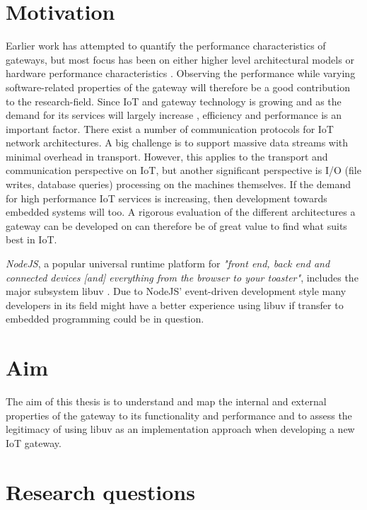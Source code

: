 \section{Motivation}
\label{sec:motivation}

Earlier work has attempted to quantify the performance characteristics of
gateways, but most focus has been on either higher level architectural models
\cite{chen2011brief} \cite{zachariah2015internet} or hardware performance
characteristics \cite{kruger2014benchmarking}. Observing the performance while
varying software-related properties of the gateway will therefore be a good
contribution to the research-field. Since IoT and gateway technology is growing
and as the demand for its services will largely increase \cite{wu2011m2m},
efficiency and performance is an important factor. There exist a number of
communication protocols for IoT network architectures. A big challenge is to
support massive data streams with minimal overhead in transport. However, this
applies to the transport and communication perspective on IoT, but another
significant perspective is I/O (file writes, database queries) processing on
the machines themselves. If the demand for high performance IoT services is
increasing, then development towards embedded systems will too. A rigorous
evaluation of the different architectures a gateway can be developed on can
therefore be of great value to find what suits best in IoT.

\textit{NodeJS}, a popular universal runtime platform for \textit{"front end,
back end and connected devices [and] everything from the browser to your
toaster"}, includes the major subsystem libuv
\cite{node-js-survey-report-2016}. Due to NodeJS' event-driven development
style many developers in its field might have a better experience using libuv
if transfer to embedded programming could be in question.

\section{Aim}
\label{sec:aim}

The aim of this thesis is to understand and map the internal and external
properties of the gateway to its functionality and performance and to assess
the legitimacy of using libuv as an implementation approach when developing a
new IoT gateway.

\section{Research questions}
\label{sec:research-questions}

